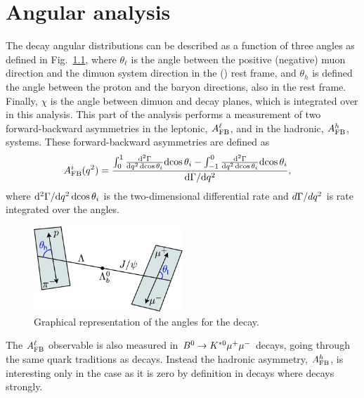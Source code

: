\chapter{Angular analysis}

The \Lb\to\Lz\mumu decay angular distributions can be described as a function of three angles
as defined in Fig.~\ref{fig:Lb_angles}, where $\theta_\ell$ is the angle between the positive
(negative) muon direction and the dimuon system direction in the \Lb(\Lbbar) rest frame,
and $\theta_h$ is defined the angle between the proton and the \Lz baryon directions, also in the
\Lb rest frame. Finally, $\chi$ is the angle between dimuon and \Lz decay planes, which is integrated
over in this analysis. %
This part of the analysis performs a measurement of two forward-backward asymmetries in the leptonic,
$A_{\rm FB}^\ell$, and in the hadronic, $A_{\rm FB}^h$, systems. These forward-backward asymmetries
are defined as
\begin{align}
A_{\rm FB}^i(q^2)&=\frac{\int_0^1 \frac{\mathrm{d}^2\Gamma}{\mathrm{d}q^2\,\mathrm{d}\!\cos\theta_i} \mathrm{d}\!\cos\theta_i-
               \int^0_{-1} \frac{\mathrm{d}^2\Gamma}{\mathrm{d}q^2\,\mathrm{d}\!\cos\theta_i} \mathrm{d}\!\cos\theta_i}{\mathrm{d}\Gamma / \mathrm{d} q^2},
\label{eq:afbTh}
\end{align}
where $\mathrm{d}^2\Gamma/\mathrm{d} q^2\,\mathrm{d}\!\cos\theta_i$ is the two-dimensional differential rate and
$d\Gamma / dq^2$ is rate integrated over the angles. 

\begin{figure}[h!]
\centering
\includegraphics[width=0.5\textwidth]{Lmumu/figs/angles.jpeg}
\caption{Graphical representation of the angles for the \decay{\Lb}{\Lz\mumu} decay.}
\label{fig:Lb_angles}
\end{figure}

The $A_{\rm FB}^\ell$ observable is also measured in $B^0\rightarrow K^{*0}\mu^+\mu^-$ decays,
going through the same quark traditions as \Lb\to\Lz\mumu decays. Instead the hadronic
asymmetry, $A_{\rm FB}^h$, is interesting only in the \Lb case as it is zero by definition
in \Bz decays where \Kstarz decays strongly.

